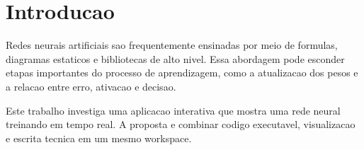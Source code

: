 \section{Introducao}

Redes neurais artificiais sao frequentemente ensinadas por meio de formulas,
diagramas estaticos e bibliotecas de alto nivel. Essa abordagem pode esconder
etapas importantes do processo de aprendizagem, como a atualizacao dos pesos e
a relacao entre erro, ativacao e decisao.

Este trabalho investiga uma aplicacao interativa que mostra uma rede neural
treinando em tempo real. A proposta e combinar codigo executavel, visualizacao
e escrita tecnica em um mesmo workspace.

